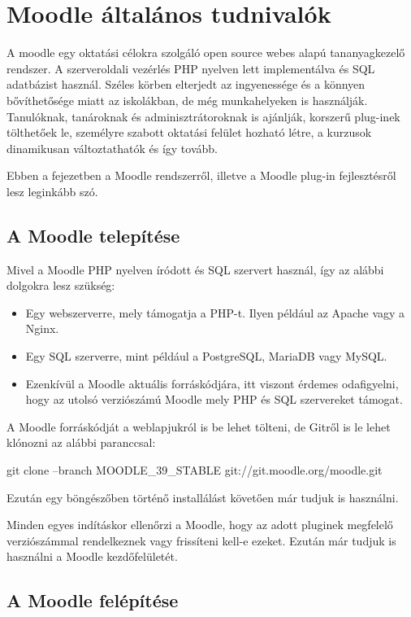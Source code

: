 \chapter{Moodle általános tudnivalók \cite{MoodleDev}}

A moodle egy oktatási célokra szolgáló open source webes alapú tananyagkezelő rendszer. A szerveroldali vezérlés PHP nyelven lett implementálva és SQL adatbázist használ. Széles körben elterjedt az ingyenessége és a könnyen bővíthetősége miatt az iskolákban, de még munkahelyeken is használják. Tanulóknak, tanároknak és adminisztrátoroknak is ajánlják, korszerű plug-inek tölthetőek le, személyre szabott oktatási felület hozható létre, a kurzusok dinamikusan változtathatók és így tovább. \par
Ebben a fejezetben a Moodle rendszerről, illetve a Moodle plug-in fejlesztésről lesz leginkább szó.

\section{A Moodle telepítése}

Mivel a Moodle PHP nyelven íródott és SQL szervert használ, így az alábbi dolgokra lesz szükség:
\begin{itemize}
    \item Egy webszerverre, mely támogatja a PHP-t. Ilyen például az Apache vagy a Nginx.
    \item Egy SQL szerverre, mint például a PostgreSQL, MariaDB vagy MySQL.
    \item Ezenkívül a Moodle aktuális forráskódjára, itt viszont érdemes odafigyelni, hogy az utolsó verziószámú Moodle mely PHP és SQL szervereket támogat.
\end{itemize}

A Moodle forráskódját a weblapjukról is be lehet tölteni, de Gitről is le lehet klónozni az alábbi paranccsal:

\begin{center}
git clone --branch MOODLE\_39\_STABLE git://git.moodle.org/moodle.git
\end{center}

Ezután egy böngészőben történő installálást követően már tudjuk is használni.\par
Minden egyes indításkor ellenőrzi a Moodle, hogy az adott pluginek megfelelő verziószámmal rendelkeznek vagy frissíteni kell-e ezeket. Ezután már tudjuk is használni a Moodle kezdőfelületét.

\section{A Moodle felépítése}


